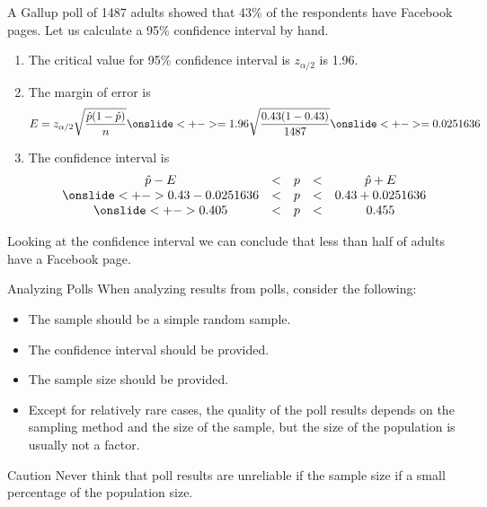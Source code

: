 \documentclass{beamer}
\begin{document}
\begin{frame}
\begin{example}
A Gallup poll of 1487 adults showed that 43\% of the respondents have Facebook pages. Let us calculate a 95\% confidence interval by hand.

\vspace{1mm}
\begin{enumerate}[<+->]
\item The critical value for 95\% confidence interval is $z_{\alpha/2}$ is 1.96.
\item The margin of error is 
\begin{equation*}
E=z_{\alpha/2}\sqrt{\dfrac{\hat{p}(1-\hat{p})}{n}}\onslide<+->
=1.96\sqrt{\dfrac{0.43(1-0.43)}{1487}}\onslide<+->
=0.0251636
\end{equation*}
\vspace{-5mm}
\item The confidence interval is
\begin{equation*}
\begin{matrix}
\hat{p} - E &<& p &<& \hat{p} + E\\\onslide<+->
0.43 - 0.0251636 &<& p &<& 0.43 + 0.0251636 \\\onslide<+->
0.405 &<& p &<& 0.455 \\
\end{matrix}
\end{equation*}
\end{enumerate}
\vspace{-6mm}
\end{example}

\onslide<+->
\begin{note}
Looking at the confidence interval we can conclude that less than half of adults have a Facebook page.
\end{note}
\end{frame}

\begin{frame}
\begin{block}{Analyzing Polls}
When analyzing results from polls, consider the following:
\begin{itemize}[<+- | alert@+>]
\item The sample should be a simple random sample.
\item The confidence interval should be provided.
\item The sample size should be provided.
\item Except for relatively rare cases, the quality of the poll results depends on the sampling method and the size of the sample, but the size of the population is usually not a factor.
\end{itemize}
\end{block}
\onslide<+->
\begin{block}{Caution}
Never think that poll results are unreliable if the sample size if a small percentage of the population size.
\end{block}
\end{frame}
\end{document}
